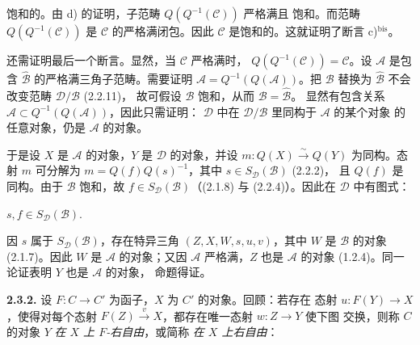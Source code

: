 \clearpage
{}%
\begingroup
\small
\setlength{\parskip}{0pt}%
\setlength{\emergencystretch}{1.5em}%
\setlength{\abovedisplayskip}{3pt plus 1pt minus 1pt}%
\setlength{\belowdisplayskip}{3pt plus 1pt minus 1pt}%

\noindent 饱和的。由 d) 的证明，子范畴 $Q(Q^{-1}(\mathcal C))$ 严格满且
饱和。而范畴 $Q(Q^{-1}(\mathcal C))$ 是 $\mathcal C$ 的严格满闭包。因此
$\mathcal C$ 是饱和的。这就证明了断言 c)$^{\mathrm{bis}}$。

还需证明最后一个断言。显然，当 $\mathcal C$ 严格满时，
$Q(Q^{-1}(\mathcal C))=\mathcal C$。设 $\mathcal A$ 是包含
$\widehat{\mathcal B}$ 的严格满三角子范畴。需要证明
$\mathcal A=Q^{-1}(Q(\mathcal A))$。把 $\mathcal B$ 替换为
$\widehat{\mathcal B}$ 不会改变范畴 $\mathcal D/\mathcal B$ (2.2.11)，
故可假设 $\mathcal B$ 饱和，从而 $\mathcal B=\widehat{\mathcal B}$。
显然有包含关系 $\mathcal A\subset Q^{-1}(Q(\mathcal A))$，因此只需证明：
$\mathcal D$ 中在 $\mathcal D/\mathcal B$ 里同构于 $\mathcal A$ 的某个对象
的任意对象，仍是 $\mathcal A$ 的对象。

于是设 $X$ 是 $\mathcal A$ 的对象，$Y$ 是 $\mathcal D$ 的对象，并设
$m\colon Q(X)\xrightarrow{\sim}Q(Y)$ 为同构。态射 $m$ 可分解为
$m=Q(f)Q(s)^{-1}$，其中 $s\in S_{\mathcal D}(\mathcal B)$ (2.2.2)，
且 $Q(f)$ 是同构。由于 $\mathcal B$ 饱和，故
$f\in S_{\mathcal D}(\mathcal B)$（(2.1.8) 与 (2.2.4)）。因此在
$\mathcal D$ 中有图式：

\begin{center}
  \qquad $s,f\in S_{\mathcal D}(\mathcal B)$\quad .
\end{center}

因 $s$ 属于 $S_{\mathcal D}(\mathcal B)$，存在特异三角
$(Z,X,W,s,u,v)$，其中 $W$ 是 $\mathcal B$ 的对象 (2.1.7)。因此 $W$
是 $\mathcal A$ 的对象；又因 $\mathcal A$ 严格满，$Z$ 也是
$\mathcal A$ 的对象 (1.2.4)。同一论证表明 $Y$ 也是 $\mathcal A$ 的对象，
命题得证。

\medskip\noindent\textbf{2.3.2.}\quad
{}
设 $F\colon C\longrightarrow C'$ 为函子，$X$ 为 $C'$ 的对象。回顾：若存在
态射 $u\colon F(Y)\longrightarrow X$，使得对每个态射
$F(Z)\xrightarrow{v}X$，都存在唯一态射 $w\colon Z\longrightarrow Y$ 使下图
交换，则称 $C$ 的对象 $Y$ \emph{在 $X$ 上 $F$-右自由}，或简称
\emph{在 $X$ 上右自由}：


